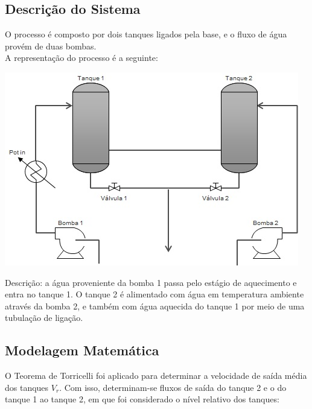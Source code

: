 \documentclass[a0,portrait]{a0poster}
\begin{document}
\begin{multicols}{2}
\section*{Descrição do Sistema}

\color{Black}

O processo é composto por dois tanques ligados pela base, e o fluxo de água provém de duas bombas. \\
\indent A representação do processo é a seguinte:

\begin{center}\vspace{1.5cm}
\includegraphics[width=0.78\linewidth]{descricao}
\end{center}\vspace{1.5cm}

Descrição: a água proveniente da bomba 1 passa pelo estágio de aquecimento e entra no tanque 1. 
O tanque 2 é alimentado com água em temperatura ambiente através da bomba 2, e também com água aquecida do tanque 1 por meio de uma tubulação de ligação. 



\vspace{1cm}
\color{DarkSlateGray} %

\subsection*{Modelagem Matemática}

\color{Black}

O Teorema de Torricelli foi aplicado para determinar a velocidade de saída média dos tanques $V_r$. Com isso, determinam-se fluxos de saída do tanque 2 e o do tanque 1 ao tanque 2, em que foi considerado o nível relativo dos tanques:


\end{multicols}
\end{document}
